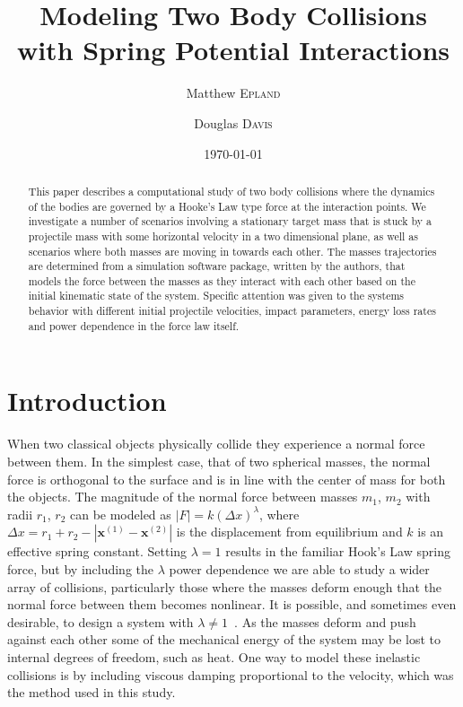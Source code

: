\documentclass[aps,prl,floatfix,preprint,nofootinbib]{revtex4}
\begin{document}
\title{Modeling Two Body Collisions with Spring Potential Interactions}
\author{Matthew \textsc{Epland}}
\author{ Douglas \textsc{Davis}}
\date{\today}

\hypersetup{pdftitle=Modeling Two Body Collisions}

\begin{abstract}
  This paper describes a computational study of two body collisions where the dynamics of the bodies are governed by a Hooke's Law type force at the interaction points. We investigate a number of scenarios involving a stationary target mass that is stuck by a projectile mass with some horizontal velocity in a two dimensional plane, as well as scenarios where both masses are moving in towards each other. The masses trajectories are determined from a simulation software package, written by the authors, that models the force between the masses as they interact with each other based on the initial kinematic state of the system. Specific attention was given to the systems behavior with different initial projectile velocities, impact parameters, energy loss rates and power dependence in the force law itself.
\end{abstract}\maketitle
\section{Introduction}
When two classical objects physically collide they experience a normal force between them. In the simplest case, that of two spherical masses, the normal force is orthogonal to the surface and is in line with the center of mass for both the objects. The magnitude of the normal force between masses $m_{1}$, $m_{2}$ with radii $r_{1}$, $r_{2}$ can be modeled as $ \left| F \right| = k \left(\Delta x\right)^{\lambda}$, where $\Delta x = r_1 + r_2 - \left| \mathbf{x}^{(1)}-\mathbf{x}^{(2)} \right|$ is the displacement from equilibrium and $k$ is an effective spring constant. Setting $\lambda = 1$ results in the familiar Hook's Law spring force, but by including the $\lambda$ power dependence we are able to study a wider array of collisions, particularly those where the masses deform enough that the normal force between them becomes nonlinear. It is possible, and sometimes even desirable, to design a system with $\lambda \neq 1$~\cite{ref_spring}. As the masses deform and push against each other some of the mechanical energy of the system may be lost to internal degrees of freedom, such as heat. One way to model these inelastic collisions is by including viscous damping proportional to the velocity, which was the method used in this study.
\end{document}
